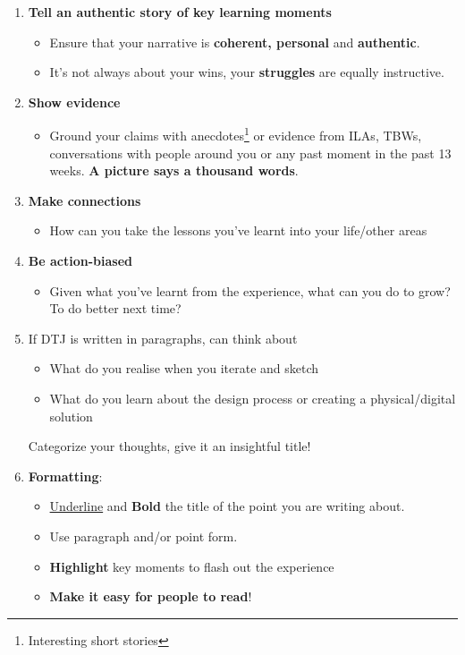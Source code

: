 \documentclass[math,code]{amznotes}
\theoremstyle{remark}
\begin{document}
\begin{enumerate}
    \item \textbf{Tell an authentic story of key learning moments}
    \begin{itemize}
        \item Ensure that your narrative is \textbf{coherent, personal} and \textbf{authentic}.
        \item It's not always about your wins, your \textbf{struggles} are equally instructive.
    \end{itemize}
    \item \textbf{Show evidence}
    \begin{itemize}
        \item Ground your claims with anecdotes\footnote{Interesting short stories} or evidence from ILAs, TBWs, conversations with people around you or any past moment in the past 13 weeks. \textbf{A picture says a thousand words}.
    \end{itemize}
    \item \textbf{Make connections}
    \begin{itemize}
        \item How can you take the lessons you've learnt into your life/other areas
    \end{itemize}
    \item \textbf{Be action-biased}
    \begin{itemize}
        \item Given what you've learnt from the experience, what can you do to grow? To do better next time?
    \end{itemize}
    \item If DTJ is written in paragraphs, can think about
    \begin{itemize}
        \item What do you realise when you iterate and sketch
        \item What do you learn about the design process or creating a physical/digital solution
    \end{itemize}
    Categorize your thoughts, give it an insightful title!
    \item \textbf{Formatting}: 
    \begin{itemize}
        \item \underline{Underline} and \textbf{Bold} the title of the point you are writing about.
        \item Use paragraph and/or point form.
        \item \textbf{Highlight} key moments to flash out the experience
        \item \textbf{Make it easy for people to read}!
    \end{itemize}
\end{enumerate}
\end{document}
